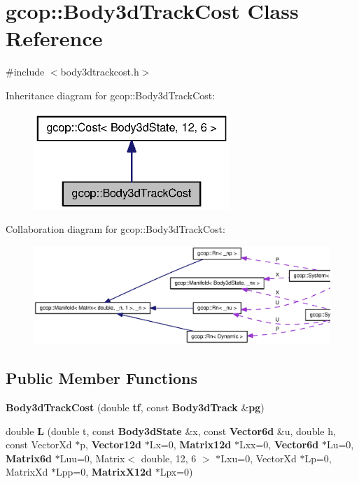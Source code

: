 \section{gcop\-:\-:\-Body3d\-Track\-Cost \-Class \-Reference}
\label{classgcop_1_1Body3dTrackCost}


{\ttfamily \#include $<$body3dtrackcost.\-h$>$}



\-Inheritance diagram for gcop\-:\-:\-Body3d\-Track\-Cost\-:\nopagebreak
\begin{figure}[H]
\begin{center}
\leavevmode
\includegraphics[width=210pt]{classgcop_1_1Body3dTrackCost__inherit__graph}
\end{center}
\end{figure}


\-Collaboration diagram for gcop\-:\-:\-Body3d\-Track\-Cost\-:\nopagebreak
\begin{figure}[H]
\begin{center}
\leavevmode
\includegraphics[width=350pt]{classgcop_1_1Body3dTrackCost__coll__graph}
\end{center}
\end{figure}
\subsection*{\-Public \-Member \-Functions}
\begin{DoxyCompactItemize}
\item 
{\bf \-Body3d\-Track\-Cost} (double {\bf tf}, const {\bf \-Body3d\-Track} \&{\bf pg})
\item 
double {\bf \-L} (double t, const {\bf \-Body3d\-State} \&x, const {\bf \-Vector6d} \&u, double h, const \-Vector\-Xd $\ast$p, {\bf \-Vector12d} $\ast$\-Lx=0, {\bf \-Matrix12d} $\ast$\-Lxx=0, {\bf \-Vector6d} $\ast$\-Lu=0, {\bf \-Matrix6d} $\ast$\-Luu=0, \-Matrix$<$ double, 12, 6 $>$ $\ast$\-Lxu=0, \-Vector\-Xd $\ast$\-Lp=0, \-Matrix\-Xd $\ast$\-Lpp=0, {\bf \-Matrix\-X12d} $\ast$\-Lpx=0)
\end{DoxyCompactItemize}
